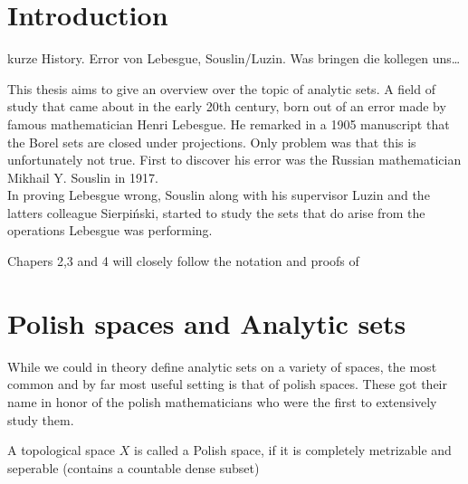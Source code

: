 \documentclass[10pt, a4paper, titlepage]{article}
\numberwithin{equation}{section}
\begin{document}
\hypersetup{pageanchor=false}


\newpage

\thispagestyle{empty}



\newpage

\tableofcontents

\newpage
\hypersetup{pageanchor=true}
\renewcommand{\thepage}{ \arabic{page} }

\setcounter{page}{1}
\onehalfspacing







\section{Introduction}
kurze History. Error von Lebesgue, Souslin/Luzin. Was bringen die kollegen uns\ldots

This thesis aims to give an overview over the topic of analytic sets. 
A field of study that came about in the early 20th century, born out of an error made by famous mathematician Henri Lebesgue. 
He remarked in a 1905 manuscript that the Borel sets are closed under projections. 
Only problem was that this is unfortunately not true. 
First to discover his error was the Russian mathematician Mikhail Y. Souslin in 1917. \cite{rogers1980}
\\
In proving Lebesgue wrong, Souslin along with his supervisor Luzin and the latters colleague Sierpiński, started to study the sets that do arise from the operations Lebesgue was performing.


Chapers 2,3 and 4 will closely follow the notation and proofs of \cite{cohn2013}



\section{Polish spaces and Analytic sets}
While we could in theory define analytic sets on a variety of spaces, the most common and by far most useful setting is that of polish spaces. These got their name in  honor of the polish mathematicians who were the first to extensively study them.

\begin{definition}
	A topological space $X$ is called a Polish space, if it is completely metrizable and seperable (contains a countable dense subset)
\end{definition}
\end{document}

